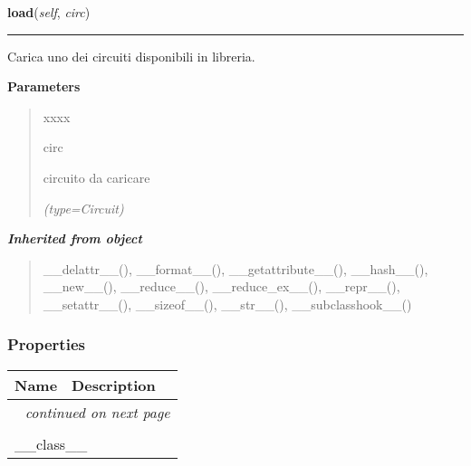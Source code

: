     \vspace{0.5ex}

\hspace{.8\funcindent}\begin{boxedminipage}{\funcwidth}

    \raggedright \textbf{load}(\textit{self}, \textit{circ})

    \vspace{-1.5ex}

    \rule{\textwidth}{0.5\fboxrule}
\setlength{\parskip}{2ex}
    Carica uno dei circuiti disponibili in libreria.

\setlength{\parskip}{1ex}
      \textbf{Parameters}
      \vspace{-1ex}

      \begin{quote}
        \begin{Ventry}{xxxx}

          \item[circ]

          circuito da caricare

            {\it (type=Circuit)}

        \end{Ventry}

      \end{quote}

    \end{boxedminipage}


\large{\textbf{\textit{Inherited from object}}}

\begin{quote}
\_\_delattr\_\_(), \_\_format\_\_(), \_\_getattribute\_\_(), \_\_hash\_\_(), \_\_new\_\_(), \_\_reduce\_\_(), \_\_reduce\_ex\_\_(), \_\_repr\_\_(), \_\_setattr\_\_(), \_\_sizeof\_\_(), \_\_str\_\_(), \_\_subclasshook\_\_()
\end{quote}


  \subsubsection{Properties}

    \vspace{-1cm}
\hspace{\varindent}\begin{longtable}{|p{\varnamewidth}|p{\vardescrwidth}|l}
\cline{1-2}
\cline{1-2} \centering \textbf{Name} & \centering \textbf{Description}& \\
\cline{1-2}
\endhead\cline{1-2}\multicolumn{3}{r}{\small\textit{continued on next page}}\\\endfoot\cline{1-2}
\endlastfoot\multicolumn{2}{|l|}{\textit{Inherited from object}}\\
\multicolumn{2}{|p{\varwidth}|}{\raggedright \_\_class\_\_}\\
\cline{1-2}
\end{longtable}


